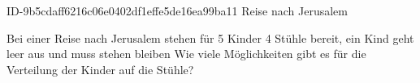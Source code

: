 \begin{exercise}
      {ID-9b5cdaff6216c06e0402df1effe5de16ea99ba11}
      {Reise nach Jerusalem}
  \ifproblem\problem\par
    Bei einer \glqq Reise nach Jerusalem\grqq{} stehen für 5 Kinder 4 Stühle
    bereit, ein Kind geht leer aus und muss stehen bleiben Wie viele
    Möglichkeiten gibt es für die Verteilung der Kinder auf die Stühle?
  \fi
\end{exercise}
